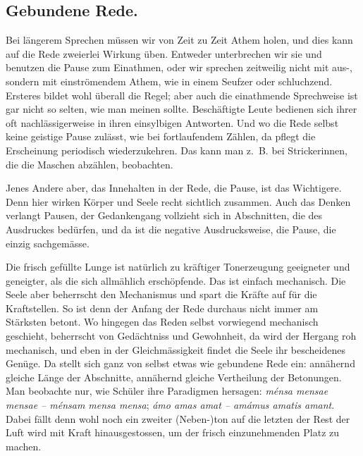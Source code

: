 {\subsection*{Gebundene Rede.}
Bei längerem Sprechen müssen wir von Zeit zu Zeit Athem holen, und dies kann auf die Rede zweierlei Wirkung üben. Entweder unterbrechen wir sie und benutzen die Pause zum Einathmen, oder wir sprechen zeitweilig nicht mit \mbox{aus-,} sondern mit einströmendem Athem, wie in einem Seufzer oder schluchzend. Ersteres bildet wohl überall die Regel; aber auch die einathmende Sprechweise ist gar nicht so selten, wie man meinen sollte. Beschäftigte Leute bedienen sich ihrer oft nachlässigerweise in ihren einsylbigen Antworten. Und wo die Rede selbst keine geistige Pause zulässt, wie bei fortlaufendem Zählen, da pflegt die Erscheinung periodisch wiederzukehren. Das kann man z.~B. bei Strickerinnen, die die Maschen abzählen, beobachten.

Jenes Andere aber, das Innehalten in der Rede, die Pause, ist das Wichtigere. Denn hier wirken Körper und Seele recht sichtlich zusammen. Auch \label{sp.226} das Denken verlangt Pausen, der Gedankengang vollzieht sich in Abschnitten, die des Ausdruckes bedürfen, und da ist die negative Ausdrucksweise, die Pause, die einzig sachgemässe.

Die frisch gefüllte Lunge ist natürlich zu kräftiger Tonerzeugung geeigneter und geneigter, als die sich allmählich erschöpfende. Das ist einfach mechanisch. Die Seele aber beherrscht den Mechanismus und \label{fp.224} spart die Kräfte auf für die Kraftstellen. So ist denn der Anfang der Rede durchaus nicht immer am Stärksten betont. Wo hingegen das Reden selbst vorwiegend mechanisch geschieht, beherrscht von Gedächtniss und Gewohnheit, da wird der Hergang roh mechanisch, und eben in der  Gleichmässigkeit findet die Seele ihr bescheidenes Genüge. Da stellt sich ganz von selbst etwas wie gebundene Rede ein: annähernd gleiche Länge der Abschnitte, annähernd gleiche Vertheilung der Betonungen. Man beobachte nur, wie Schüler ihre Paradigmen hersagen: \textit{ménsa mensae mensae – ménsam mensa mensa}; \textit{ámo amas amat – amámus amatis amant}. Dabei fällt denn wohl noch ein zweiter (Neben-)ton auf die letzten   der Rest der Luft wird mit Kraft hinausgestossen, um der frisch einzunehmenden Platz zu machen.

}
